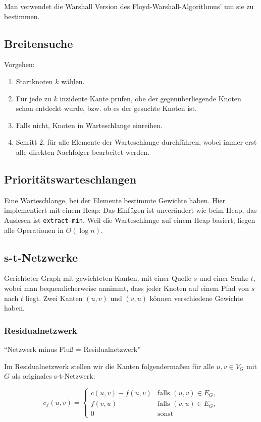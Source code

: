 \documentclass[11pt]{scrartcl}
\begin{document}
Man verwendet die Warshall Version des Floyd-Warshall-Algorithmus' um sie zu bestimmen.

\subsection{Breitensuche}
Vorgehen:
\begin{enumerate}
\item Startknoten $k$ wählen.
\item Für jede zu $k$ inzidente Kante prüfen, obe der gegenüberliegende Knoten schon entdeckt wurde, bzw. ob es der gesuchte Knoten ist.
\item Falls nicht, Knoten in Warteschlange einreihen.
\item Schritt 2. für alle Elemente der Warteschlange durchführen, wobei immer erst alle direkten Nachfolger bearbeitet werden.
\end{enumerate}

\subsection{Prioritätswarteschlangen}

Eine Warteschlange, bei der Elemente bestimmte Gewichte haben. Hier implementiert mit einem Heap: Das Einfügen ist unverändert wie beim Heap, das Auslesen ist \texttt{extract-min}. Weil die Warteschlange auf einem Heap basiert, liegen alle Operationen in $O(\log n)$.

\subsection{s-t-Netzwerke}
Gerichteter Graph mit gewichteten Kanten, mit einer Quelle $s$ und einer Senke $t$, wobei man bequemlicherweise annimmt, dass jeder Knoten auf einem Pfad von $s$ nach $t$ liegt. Zwei Kanten $(u,v)$ und $(v,u)$ können verschiedene Gewichte haben.

\subsubsection{Residualnetzwerk}

``Netzwerk minus Fluß = Residualnetzwerk''

Im Residualnetzwerk stellen wir die Kanten folgendermaßen für alle $u,v \in V_G$ mit $G$ als originales s-t-Netzwerk:

$$c_f(u,v) = \begin{cases}
	c(u,v) - f(u,v) & \text{falls } (u,v) \in E_G, \\
    f(v,u) & \text{falls } (v,u) \in E_G, \\
    0 & \text{sonst}
\end{cases}$$
\end{document}
